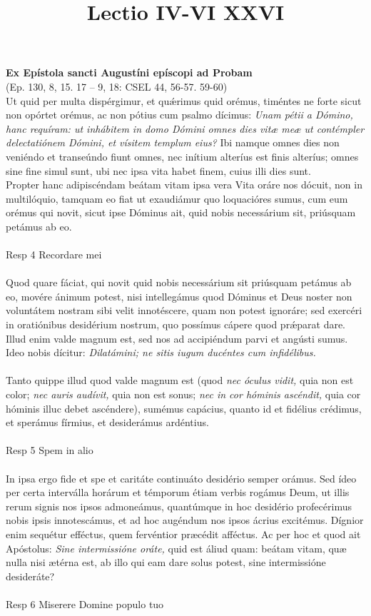 \documentclass[options]{article}
\title{Lectio IV-VI XXVI}
\begin{document}
\textbf{Ex Epístola sancti Augustíni epíscopi ad Probam}\\
(Ep. 130, 8, 15. 17 – 9, 18: CSEL 44, 56-57. 59-60)	\\

Ut quid per multa dispérgimur, et qu\'{æ}rimus quid orémus, timéntes ne forte sicut non opórtet orémus, ac non pótius cum psalmo dícimus: 
\textit{Unam pétii a Dómino, hanc requíram: ut inhábitem in domo Dómini omnes dies vitæ meæ ut contémpler delectatiónem Dómini, et vísitem templum eius?}
 Ibi namque omnes dies non veniéndo et transeúndo fiunt omnes, nec inítium alteríus est finis alteríus; omnes sine fine simul sunt, ubi nec ipsa vita habet finem, cuius illi dies sunt.\\
 
 Propter hanc adipiscéndam beátam vitam ipsa vera Vita oráre nos dócuit, non in multilóquio, tamquam eo fiat ut exaudiámur quo loquacióres sumus, cum eum orémus qui novit, sicut ipse Dóminus ait, quid nobis necessárium sit, priúsquam petámus ab eo.\\
 \\
 Resp 4 Recordare mei \\
 \\
 
 Quod quare fáciat, qui novit quid nobis necessárium sit priúsquam petámus ab eo, movére ánimum potest, nisi intellegámus quod Dóminus et Deus noster non voluntátem nostram sibi velit innotéscere, quam non potest ignoráre; sed exercéri in oratiónibus desidérium nostrum, quo possímus cápere quod pr\'{æ}parat dare. Illud enim valde magnum est, sed nos ad accipiéndum parvi et angústi sumus. Ideo nobis dícitur:
 \textit{Dilatámini; ne sitis iugum ducéntes cum infidélibus.}\\
 \\
  Tanto quippe illud quod valde magnum est (quod 
  \textit{nec óculus vidit,}
  quia non est color;
  \textit{nec auris audívit,}
quia non est sonus;
\textit{nec in cor hóminis ascéndit,}
quia cor hóminis illuc debet ascéndere), sumémus capácius, quanto id et fidélius crédimus, et sperámus fírmius, et desiderámus ardéntius.\\
\\
Resp 5 Spem in alio\\
\\
In ipsa ergo fide et spe et caritáte continuáto desidério semper orámus. Sed ídeo per certa interválla horárum et témporum étiam verbis rogámus Deum, ut illis rerum signis nos ipsos admoneámus, quantúmque in hoc desidério profecérimus nobis ipsis innotescámus, et ad hoc augéndum nos ipsos ácrius excitémus. Dígnior enim sequétur efféctus, quem fervéntior præcédit afféctus. Ac per hoc et quod ait Apóstolus: 
\textit{Sine intermissióne oráte,}
 quid est áliud quam: beátam vitam, quæ nulla nisi ætérna est, ab illo qui eam dare solus potest, sine intermissióne desideráte?\\
 \\
 
 Resp 6 Miserere Domine populo tuo
\end{document}
